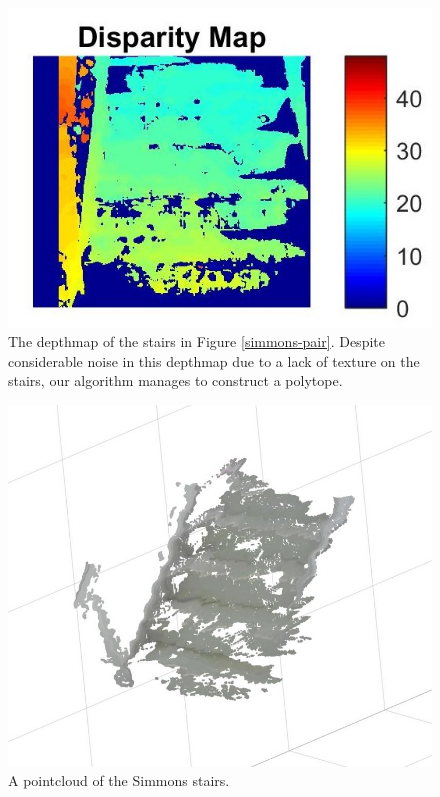 \begin{figure}[!h]
\centering
\includegraphics[width=\columnwidth]{Sections/Figures/simmons-stairs-depthmap.jpg}
\caption{The depthmap of the stairs in Figure \ref{simmons-pair}. Despite considerable noise in this depthmap due to a lack of texture on the stairs, our algorithm manages to construct a polytope.}
\label{simmons-depthmap}
\end{figure}

\begin{figure}[!h]
\centering
\includegraphics[width=\columnwidth]{Sections/Figures/simmons-stairs-ptcloud.jpg}
\caption{A pointcloud of the Simmons stairs.}
\label{simmons-ptcloud}
\end{figure}

